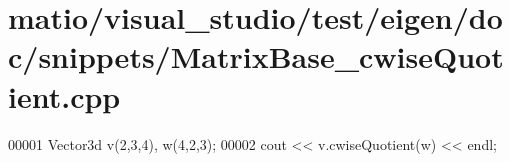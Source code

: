 \hypertarget{matio_2visual__studio_2test_2eigen_2doc_2snippets_2_matrix_base__cwise_quotient_8cpp_source}{}\section{matio/visual\+\_\+studio/test/eigen/doc/snippets/\+Matrix\+Base\+\_\+cwise\+Quotient.cpp}
\label{matio_2visual__studio_2test_2eigen_2doc_2snippets_2_matrix_base__cwise_quotient_8cpp_source}

\begin{DoxyCode}
00001 Vector3d v(2,3,4), w(4,2,3);
00002 cout << v.cwiseQuotient(w) << endl;
\end{DoxyCode}
